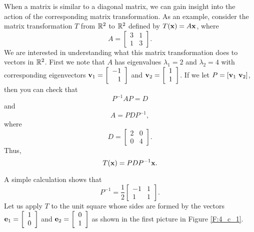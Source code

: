 \label{sec:sim_mtx_trans}

When a matrix is similar to a diagonal matrix, we can gain insight into the action of the corresponding matrix transformation. As an example,  consider the matrix transformation $T$ from $\mathbb{R}^2$ to $\mathbb{R}^2$ defined by $T(\mathbf{x}) = A \mathbf{x}$, where
\begin{equation} \label{eq:4_c_1}
A = \left[ \begin{array}{cc} 3&1\\1&3 \end{array} \right].
\end{equation}
We are interested in understanding what this matrix transformation does to vectors in $\mathbb{R}^2$. First we note that $A$ has eigenvalues $\lambda_1 = 2$ and $\lambda_2 = 4$ with corresponding eigenvectors $\mathbf{v}_1 = \left[ \begin{array}{r} -1\\1 \end{array} \right]$ and $\mathbf{v}_2 = \left[ \begin{array}{c} 1\\1 \end{array} \right]$. If we let $P = [\vv_1 \ \vv_2]$, then you can check that 
\[P^{-1}AP = D\]
and
\[A = PDP^{-1},\]
where 
\[D = \left[ \begin{array}{cc} 2 & 0 \\ 0 & 4 \end{array} \right].\]
Thus,
\[T(\mathbf{x}) = PDP^{-1}\mathbf{x}.\]

A simple calculation shows that 
\[P^{-1} = \frac{1}{2}\left[ \begin{array}{rc} -1&1 \\ 1&1 \end{array} \right].\]
Let us apply $T$ to the unit square whose sides are formed by the vectors $\mathbf{e}_1 = \left[ \begin{array}{c} 1 \\ 0 \end{array} \right]$ and $\mathbf{e}_2 = \left[ \begin{array}{c} 0 \\ 1 \end{array} \right]$ as shown in the first picture in Figure \ref{F:4_c_1}. 

